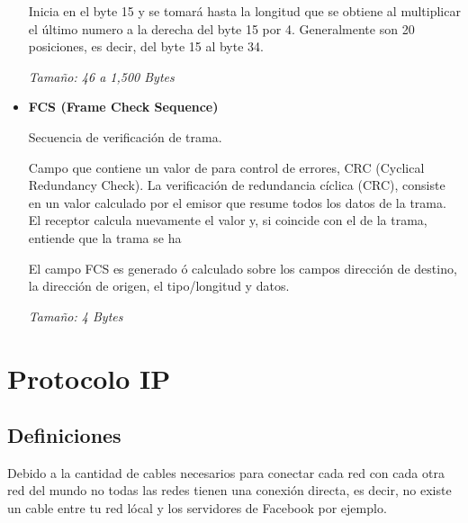 \documentclass[12pt, fleqn]{report}                             %
\theoremstyle{break}                                            %
\begin{document}
\begin{itemize}
                        Inicia en el byte 15 y se tomará hasta la longitud que se obtiene al multiplicar el último numero a la derecha
                        del byte 15 por 4. Generalmente son 20 posiciones, es decir, del byte 15 al byte 34.

                        \emph{Tamaño: 46 a 1,500 Bytes} 


                    \item
                        \textbf{FCS (Frame Check Sequence)}

                        Secuencia de verificación de trama. 

                        Campo que contiene un valor de para control de errores, CRC (Cyclical Redundancy Check).
                        La verificación de redundancia cíclica (CRC), consiste en un valor calculado por el emisor que resume todos
                        los datos de la trama.
                        El receptor calcula nuevamente el valor y, si coincide con el de la trama, entiende que la trama se ha

                        El campo FCS es generado ó calculado sobre los campos dirección de destino, la dirección de origen,
                        el tipo/longitud y datos. 
                        
                        \emph{Tamaño: 4 Bytes} 

                \end{itemize}





    \chapter{Protocolo IP}


        \clearpage
        \section{Definiciones}

            Debido a la cantidad de cables necesarios para conectar cada red con cada otra red del mundo
            no todas las redes tienen una conexión directa, es decir, no existe un cable entre tu red
            lócal y los servidores de Facebook por ejemplo.
\end{document}
